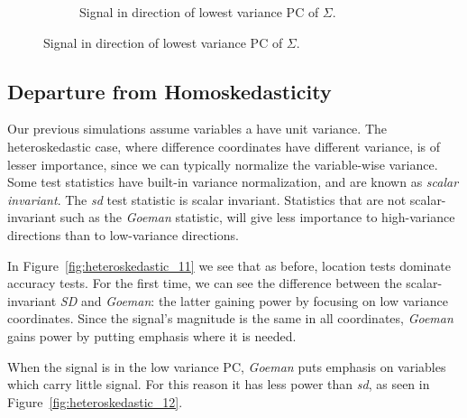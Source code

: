 \documentclass[12pt,a4paper]{article}
\begin{document}
\begin{figure}[h]
\begin{subfigure}[t]{.4\textwidth}
		\caption{Signal in direction of lowest variance PC of $\Sigma$.} 
		\label{fig:dependence_32}
	\end{subfigure}
\end{figure}



\subsection{Departure from Homoskedasticity}

Our previous simulations assume variables a have unit variance. 
The heteroskedastic case, where difference coordinates have different variance, is of lesser importance, since we can typically normalize the variable-wise variance. 
Some test statistics have built-in variance normalization, and are known as \emph{scalar invariant}. 
The \emph{sd} test statistic is scalar invariant. 
Statistics that are not scalar-invariant such as the \emph{Goeman} statistic, will give less importance to high-variance directions than to low-variance directions. 

In Figure~\ref{fig:heteroskedastic_11} we see that as before, location tests dominate accuracy tests.
For the first time, we can see the difference between the scalar-invariant \emph{SD} and \emph{Goeman}: the latter gaining power by focusing on low variance coordinates. Since the signal's magnitude is the same in all coordinates, \emph{Goeman} gains power by putting emphasis where it is needed.

When the signal is in the low variance PC, \emph{Goeman} puts emphasis on variables which carry little signal.
For this reason it has less power than \emph{sd}, as seen in Figure~\ref{fig:heteroskedastic_12}.
\end{document}
